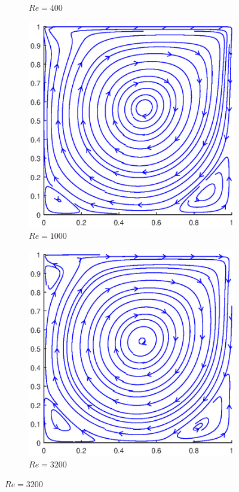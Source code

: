 \begin{figure}[h]
\begin{subfigure}{0.5\textwidth}
		\caption{$Re=400$}
	\end{subfigure}
	\begin{subfigure}{0.5\textwidth}
		\includegraphics[scale=0.61]{DrivenCavity/1000}
		\caption{$Re=1000$}
	\end{subfigure}%
	\begin{subfigure}{0.5\textwidth}
		\includegraphics[scale=0.61]{DrivenCavity/3200}
		\caption{$Re=3200$}
	\end{subfigure}
\end{figure}
